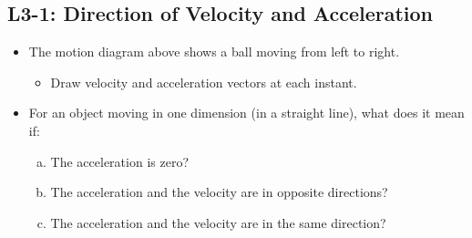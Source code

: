 \documentclass[]{article}
\begin{document}
\begin{TeacherMargin}

\end{TeacherMargin}
\begin{PresentSpace}
\section*{L3-1: Direction of Velocity and Acceleration}
\begin{center}
\end{center}
\vspace{0.25cm}
\begin{itemize}
	\item The motion diagram above shows a ball moving from left to right.
	\begin{itemize}
		\item Draw velocity and acceleration vectors at each instant.
	\end{itemize}
	\item For an object moving in one dimension (in a straight line), what does it mean if:
	\begin{enumerate}[(a)]
		\item The acceleration is zero?
		\item The acceleration and the velocity are in opposite directions?
		\item The acceleration and the velocity are in the same direction?
	\end{enumerate}
\end{itemize}
\end{PresentSpace}
\end{document}

